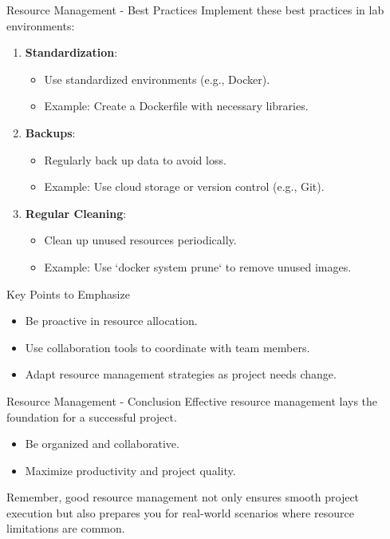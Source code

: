 \documentclass[aspectratio=169]{beamer}
\begin{document}
\begin{frame}[fragile]{Resource Management - Best Practices}
  Implement these best practices in lab environments:
  \begin{enumerate}
    \item \textbf{Standardization}:
    \begin{itemize}
      \item Use standardized environments (e.g., Docker).
      \item Example: Create a Dockerfile with necessary libraries.
    \end{itemize}
    
    \item \textbf{Backups}:
    \begin{itemize}
      \item Regularly back up data to avoid loss.
      \item Example: Use cloud storage or version control (e.g., Git).
    \end{itemize}

    \item \textbf{Regular Cleaning}:
    \begin{itemize}
      \item Clean up unused resources periodically.
      \item Example: Use `docker system prune` to remove unused images.
    \end{itemize}
  \end{enumerate}
  
  \begin{block}{Key Points to Emphasize}
      \begin{itemize}
          \item Be proactive in resource allocation.
          \item Use collaboration tools to coordinate with team members.
          \item Adapt resource management strategies as project needs change.
      \end{itemize}
  \end{block}
\end{frame}

\begin{frame}[fragile]{Resource Management - Conclusion}
  Effective resource management lays the foundation for a successful project. 
  \begin{itemize}
    \item Be organized and collaborative.
    \item Maximize productivity and project quality.
  \end{itemize}
  
  Remember, good resource management not only ensures smooth project execution but also prepares you for real-world scenarios where resource limitations are common.
\end{frame}
\end{document}
